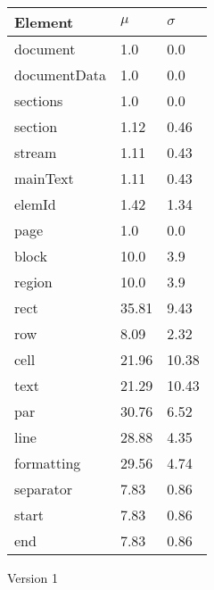 \begin{figure}[H]
\centering
\begin{footnotesize}
\begin{tabular}{lll}
\hline\hline
Element & $\mu$ & $\sigma$\\
\hline
document & 1.0 & 0.0 \\
documentData & 1.0 & 0.0 \\
sections & 1.0 & 0.0 \\
section & 1.12 & 0.46 \\
stream & 1.11 & 0.43 \\
mainText & 1.11 & 0.43 \\
elemId & 1.42 & 1.34 \\
page & 1.0 & 0.0 \\
block & 10.0 & 3.9 \\
region & 10.0 & 3.9 \\
rect & 35.81 & 9.43 \\
row & 8.09 & 2.32 \\
cell & 21.96 & 10.38 \\
text & 21.29 & 10.43 \\
par & 30.76 & 6.52 \\
line & 28.88 & 4.35 \\
formatting & 29.56 & 4.74 \\
separator & 7.83 & 0.86 \\
start & 7.83 & 0.86 \\
end & 7.83 & 0.86 \\
\hline\hline
\end{tabular}
\end{footnotesize}
\begin{quote}
\caption{Version 1}
\end{quote}
\end{figure}
